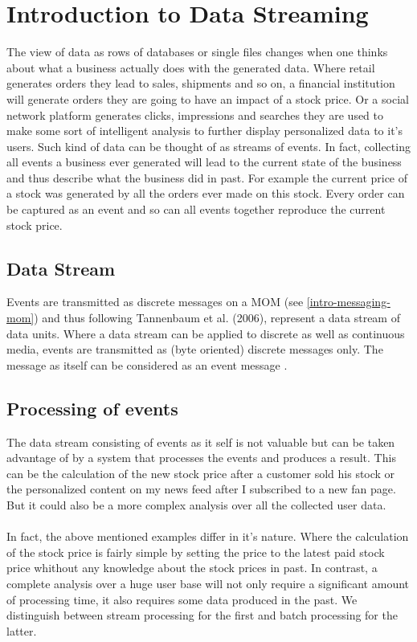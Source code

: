 \chapter{Introduction to Data Streaming}

The view of data as rows of databases or single files changes when one thinks
about what a business actually does with the generated data. Where retail
generates orders they lead to sales, shipments and so on, a financial institution will
generate orders they are going to have an impact of a stock price. Or a social
network platform generates clicks, impressions and searches they are used to
make some sort of intelligent analysis to further display personalized data to
it's users. Such kind of data can be thought of as streams of
events. In fact, collecting all events a business ever generated will lead to the current state
of the business and thus describe what the business did in past. For example the
current price of a stock was generated by all the orders ever made on this
stock. Every order can be captured as an event and so can all events together reproduce
the current stock price.

\section{Data Stream}
\label{intro-datastream-datastream}
Events are transmitted as discrete messages on a MOM (see \ref{intro-messaging-mom}) and thus
following Tannenbaum et al. (2006), represent a data stream of data units. 
Where a data stream can be applied to discrete as well as continuous media, events are
transmitted as (byte oriented) discrete messages only. The message as itself can
be considered as an event message \cite{EIP03}.

\section{Processing of events}

The data stream consisting of events as it self is not valuable but
can be taken advantage of by a system that processes the events and produces a
result. This can be the calculation of the new stock price after a customer sold
his stock or the personalized content on my news feed after I subscribed to a new fan
page. But it could also be a more complex analysis over all the collected user
data.
\\ \\
In fact, the above mentioned examples differ in it's nature. Where the
calculation of the stock price is fairly simple by setting the price to the
latest paid stock price whithout any knowledge about the stock prices in past. 
In contrast, a complete analysis over a huge user base will not only require a
significant amount of processing time, it also requires some data produced in the
past. We distinguish between stream processing for the first and batch
processing for the latter.

